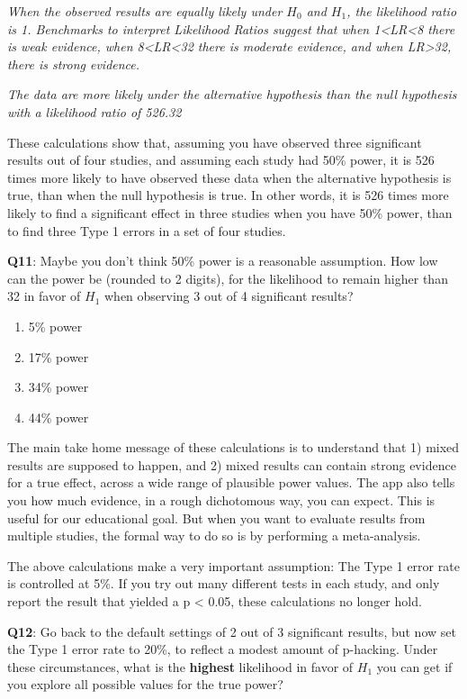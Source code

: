 \documentclass[
  oneside]{krantz}
\providecommand{\tightlist}{%
  \setlength{\itemsep}{0pt}\setlength{\parskip}{0pt}}
\begin{document}
\emph{When the observed results are equally likely under \(H_0\) and \(H_1\), the likelihood ratio is 1. Benchmarks to interpret Likelihood Ratios suggest that when 1\textless LR\textless8 there is weak evidence, when 8\textless LR\textless32 there is moderate evidence, and when LR\textgreater32, there is strong evidence.}

\emph{The data are more likely under the alternative hypothesis than the null hypothesis with a likelihood ratio of 526.32}

These calculations show that, assuming you have observed three significant results out of four studies, and assuming each study had 50\% power, it is 526 times more likely to have observed these data when the alternative hypothesis is true, than when the null hypothesis is true. In other words, it is 526 times more likely to find a significant effect in three studies when you have 50\% power, than to find three Type 1 errors in a set of four studies.

\textbf{Q11}: Maybe you don't think 50\% power is a reasonable assumption. How low can the power be (rounded to 2 digits), for the likelihood to remain higher than 32 in favor of \(H_1\) when observing 3 out of 4 significant results?

\begin{enumerate}
\def\labelenumi{\Alph{enumi})}
\tightlist
\item
  5\% power
\item
  17\% power
\item
  34\% power
\item
  44\% power
\end{enumerate}

The main take home message of these calculations is to understand that 1) mixed results are supposed to happen, and 2) mixed results can contain strong evidence for a true effect, across a wide range of plausible power values. The app also tells you how much evidence, in a rough dichotomous way, you can expect. This is useful for our educational goal. But when you want to evaluate results from multiple studies, the formal way to do so is by performing a meta-analysis.

The above calculations make a very important assumption: The Type 1 error rate is controlled at 5\%. If you try out many different tests in each study, and only report the result that yielded a p \textless{} 0.05, these calculations no longer hold.

\textbf{Q12}: Go back to the default settings of 2 out of 3 significant results, but now set the Type 1 error rate to 20\%, to reflect a modest amount of p-hacking. Under these circumstances, what is the \textbf{highest} likelihood in favor of \(H_1\) you can get if you explore all possible values for the true power?
\end{document}
